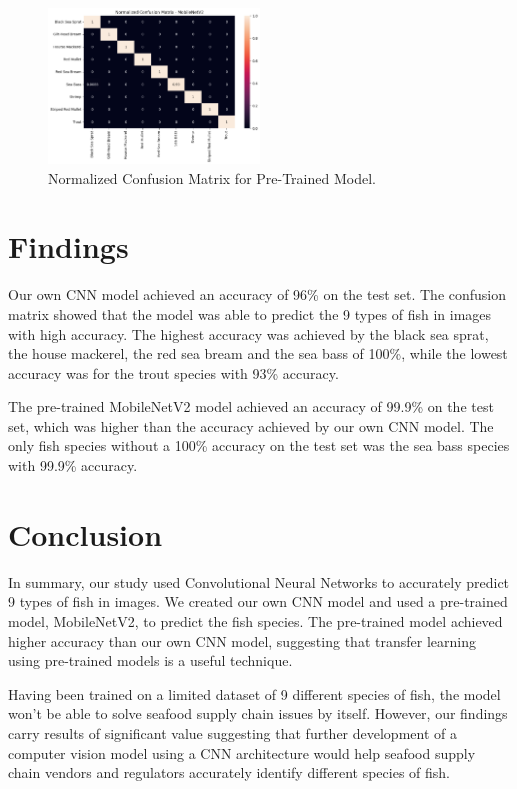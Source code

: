 \documentclass[a4paper, twocolumn]{article}
\begin{document}
\begin{figure}[h]
\centering
\includegraphics[width=0.5\textwidth]{figures/confusion_matrix_pretrained.png}
\caption{Normalized Confusion Matrix for Pre-Trained Model.}
\label{fig:example}
\end{figure}

\section{Findings}\label{sec: Findings}
Our own CNN model achieved an accuracy of 96\% on the test set. The confusion matrix showed that the model was able to predict the 9 types of fish in images with high accuracy. The highest accuracy was achieved by the black sea sprat, the house mackerel, the red sea bream and the sea bass of 100\%, while the lowest accuracy was for the trout species with 93\% accuracy.

The pre-trained MobileNetV2 model achieved an accuracy of 99.9\% on the test set, which was higher than the accuracy achieved by our own CNN model. The only fish species without a 100\% accuracy on the test set was the sea bass species with 99.9\% accuracy.


\section{Conclusion}\label{sec: Conclusion}
In summary, our study used Convolutional Neural Networks to accurately predict 9 types of fish in images. We created our own CNN model and used a pre-trained model, MobileNetV2, to predict the fish species. The pre-trained model achieved higher accuracy than our own CNN model, suggesting that transfer learning using pre-trained models is a useful technique.

Having been trained on a limited dataset of 9 different species of fish, the model won't be able to solve seafood supply chain issues by itself. However, our findings carry results of significant value suggesting that further development of a computer vision model using a CNN architecture would help seafood supply chain vendors and regulators accurately identify different species of fish.

\printbibliography
\end{document}

